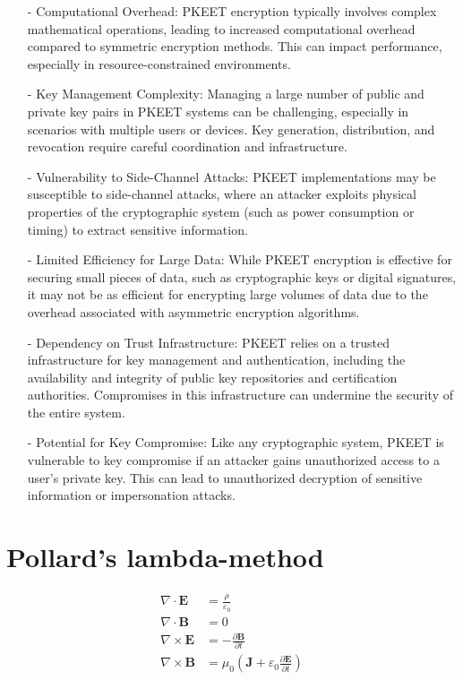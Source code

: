 \documentclass[12pt]{article}
\begin{document}
\begin{itemize}
    \item[-]Computational Overhead: PKEET encryption typically involves complex mathematical operations, leading to increased computational overhead compared to symmetric encryption methods. This can impact performance, especially in resource-constrained environments.
    \item[-]Key Management Complexity: Managing a large number of public and private key pairs in PKEET systems can be challenging, especially in scenarios with multiple users or devices. Key generation, distribution, and revocation require careful coordination and infrastructure.
    \item[-]Vulnerability to Side-Channel Attacks: PKEET implementations may be susceptible to side-channel attacks, where an attacker exploits physical properties of the cryptographic system (such as power consumption or timing) to extract sensitive information.
    \item[-]Limited Efficiency for Large Data: While PKEET encryption is effective for securing small pieces of data, such as cryptographic keys or digital signatures, it may not be as efficient for encrypting large volumes of data due to the overhead associated with asymmetric encryption algorithms.
    \item[-]Dependency on Trust Infrastructure: PKEET relies on a trusted infrastructure for key management and authentication, including the availability and integrity of public key repositories and certification authorities. Compromises in this infrastructure can undermine the security of the entire system.
    \item[-]Potential for Key Compromise: Like any cryptographic system, PKEET is vulnerable to key compromise if an attacker gains unauthorized access to a user's private key. This can lead to unauthorized decryption of sensitive information or impersonation attacks.
\end{itemize}
\section{Pollard’s lambda-method}


\begin{align*}
\nabla \cdot \mathbf{E} &= \frac{\rho}{\varepsilon_0} \\
\nabla \cdot \mathbf{B} &= 0 \\
\nabla \times \mathbf{E} &= -\frac{\partial \mathbf{B}}{\partial t} \\
\nabla \times \mathbf{B} &= \mu_0 \left( \mathbf{J} + \varepsilon_0 \frac{\partial \mathbf{E}}{\partial t} \right)
\end{align*}
\end{document}
